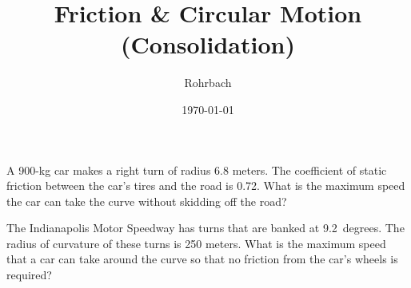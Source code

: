 \documentclass[10pt]{exam}
\title{Friction \& Circular Motion (Consolidation)}
\author{Rohrbach}
\date{\today}
\begin{document}
\maketitle


\begin{questions}

\question
  A 900-kg car makes a right turn of radius 6.8 meters.  The coefficient of static friction between the car's tires and the road is 0.72.  What is the maximum speed the car can take the curve without skidding off the road?

  \vspace{1em}

  \vs

\question
  The Indianapolis Motor Speedway has turns that are banked at 9.2~degrees.  The radius of curvature of these turns is 250 meters.  What is the maximum speed that a car can take around the curve so that no friction from the car's wheels is required?
  \vs[2]

\end{questions}
\end{document}
